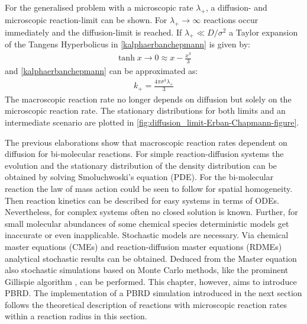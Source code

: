 \documentclass[
  a4paper,BCOR10mm,oneside,
  headsepline,footsepline,%
  fleqn,openbib
]{scrbook}
\begin{document}
\par
For the generalised problem with a microscopic rate $\lambda_{+}$, a diffusion- and microscopic reaction-limit can be shown. For $\lambda_{+} \rightarrow \infty $ reactions occur immediately and the diffusion-limit is reached. If  $\lambda_{+} \ll D/\sigma^2$ a Taylor expansion of the Tangens Hyperbolicus in \cref{kalphaerbanchepmann} is given by:
\begin{align}
\tanh{x\rightarrow 0} \approx x-\frac{x^3}{3}
\end{align}
and \cref{kalphaerbanchepmann} can be approximated as:
\begin{align}
 k_{+}=\frac{4 \pi \sigma^3 \lambda_{+}}{3}
\end{align}
The macroscopic reaction rate no longer depends on diffusion but solely on the microscopic reaction rate. The stationary distributions for both limits and an intermediate scenario are plotted in \cref{fig:diffusion_limit-Erban-Chapmann-figure}.\par
The previous elaborations show that macroscopic reaction rates dependent on diffusion for bi-molecular reactions. For simple reaction-diffusion systems the evolution and the stationary distribution of the density distribution can be obtained by solving Smoluchwoski's equation (PDE). For the bi-molecular reaction the law of mass action could be seen to follow for spatial homogeneity. Then reaction kinetics can be described for easy systems in terms of ODEs. Nevertheless, for complex systems often no closed solution is known. Further, for small molecular abundances of some chemical species deterministic models get inaccurate or even inapplicable. Stochastic models are necessary. Via chemical master equations (CMEs) and reaction-diffusion master equations (RDMEs) analytical stochastic results can be obtained. Deduced from the Master equation also stochastic simulations based on Monte Carlo methods, like the prominent Gillispie algorithm \cite{Gillespie1977}, can be performed. This chapter, however, aims to introduce PBRD. The implementation of a PBRD simulation introduced in the next section follows the theoretical description of reactions with microscopic reaction rates within a reaction radius in this section.
% 
% 
% 
% 
% 
% 
% 
% 
% 
% 
% 
% 
% 
% 
% 
\end{document}
